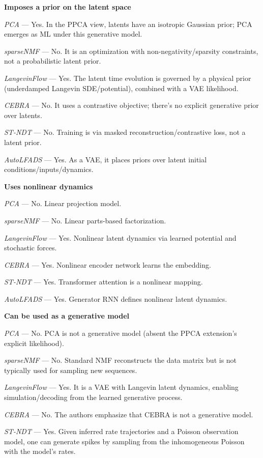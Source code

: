 \textbf{Imposes a prior on the latent space}

\textit{PCA} — Yes. In the PPCA view, latents have an isotropic Gaussian prior; PCA emerges as ML under this generative model.

\textit{sparseNMF} — No. It is an optimization with non-negativity/sparsity constraints, not a probabilistic latent prior.

\textit{LangevinFlow} — Yes. The latent time evolution is governed by a physical prior (underdamped Langevin SDE/potential), combined with a VAE likelihood.

\textit{CEBRA} — No. It uses a contrastive objective; there's no explicit generative prior over latents.

\textit{ST-NDT} — No. Training is via masked reconstruction/contrastive loss, not a latent prior.

\textit{AutoLFADS} — Yes. As a VAE, it places priors over latent initial conditions/inputs/dynamics.

\textbf{Uses nonlinear dynamics}

\textit{PCA} — No. Linear projection model.

\textit{sparseNMF} — No. Linear parts-based factorization.

\textit{LangevinFlow} — Yes. Nonlinear latent dynamics via learned potential and stochastic forces.

\textit{CEBRA} — Yes. Nonlinear encoder network learns the embedding.

\textit{ST-NDT} — Yes. Transformer attention is a nonlinear mapping.

\textit{AutoLFADS} — Yes. Generator RNN defines nonlinear latent dynamics.

\textbf{Can be used as a generative model}

\textit{PCA} — No. PCA is not a generative model (absent the PPCA extension's explicit likelihood).

\textit{sparseNMF} — No. Standard NMF reconstructs the data matrix but is not typically used for sampling new sequences.

\textit{LangevinFlow} — Yes. It is a VAE with Langevin latent dynamics, enabling simulation/decoding from the learned generative process.

\textit{CEBRA} — No. The authors emphasize that CEBRA is not a generative model.

\textit{ST-NDT} — Yes. Given inferred rate trajectories and a Poisson observation model, one can generate spikes by sampling from the inhomogeneous Poisson with the model's rates.

